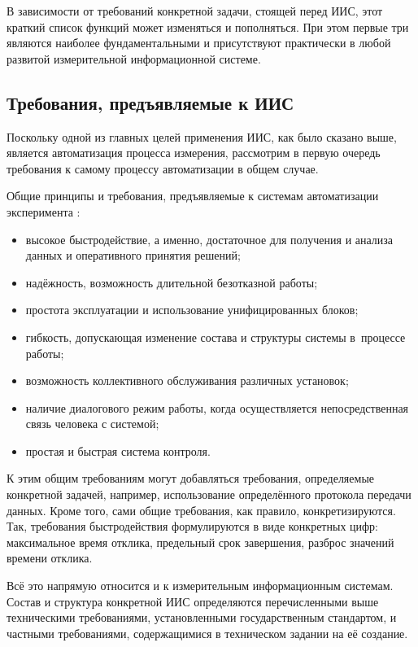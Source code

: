 \documentclass[a4paper, 14pt, titlepage]{extarticle}
\begin{document}
  В зависимости от требований конкретной задачи, стоящей перед ИИС, этот краткий список функций
  может изменяться и пополняться. При этом первые три являются наиболее фундаментальными и
  присутствуют практически в любой развитой измерительной информационной системе. %

  \subsection{Требования, предъявляемые к ИИС}\label{ssec:iis-requirements}

  Поскольку одной из главных целей применения ИИС, как было сказано выше, является автоматизация процесса
  измерения, рассмотрим в первую очередь требования к самому процессу автоматизации в общем случае.

  Общие принципы и требования, предъявляемые к системам автоматизации эксперимента \cite{vinogradov-discrete, kurochkin-kamak}:
  \begin{itemize}
    \item высокое быстродействие, а именно, достаточное для получения и анализа данных и оперативного принятия решений;
    \item надёжность, возможность длительной безотказной работы;
    \item простота эксплуатации и использование унифицированных блоков;
    \item гибкость, допускающая изменение состава и структуры системы в~процессе работы;
    \item возможность коллективного обслуживания различных установок;
    \item наличие диалогового режим работы, когда осуществляется непосредственная связь человека с системой;
    \item простая и быстрая система контроля.
  \end{itemize}

  К этим общим требованиям могут добавляться требования, определяемые конкретной задачей, например,
  использование определённого протокола передачи данных. Кроме того, сами общие требования, как
  правило, конкретизируются. Так, требования быстродействия формулируются в виде конкретных цифр:
  максимальное время отклика, предельный срок завершения, разброс значений времени отклика.

  Всё это напрямую относится и к измерительным информационным системам.  Состав и структура
  конкретной ИИС определяются перечисленными выше техническими требованиями, установленными
  государственным стандартом, и частными требованиями, содержащимися в техническом задании на её
  создание.
\end{document}
